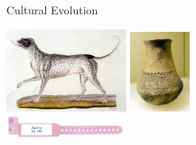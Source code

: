 \documentclass[12pt, notes=show]{beamer}
\begin{document}
\begin{frame}{Cultural Evolution}
	\begin{center}
		\includegraphics[width=4cm]{images/dalmatian.jpg} \hspace{2cm}
		\includegraphics[width=2cm]{images/pottery.jpg}\\
		\vspace{1cm}
		\includegraphics[width=4cm]{images/name.jpg}
	\end{center}
\end{frame}
\end{document}
